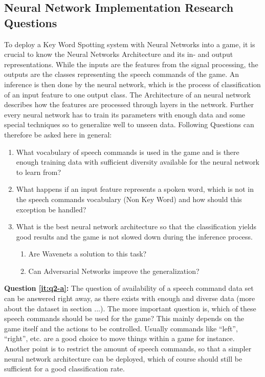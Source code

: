 \subsection{Neural Network Implementation Research Questions}
To deploy a Key Word Spotting system with Neural Networks into a game, it is crucial to know the Neural Networks Architecture and its in- and output representations. 
While the inputs are the features from the signal processing, the outputs are the classes representing the speech commands of the game. 
An inference is then done by the neural network, which is the process of classification of an input feature to one output class.
The Architecture of an neural network describes how the features are processed through layers in the network.
Further every neural network has to train its parameters with enough data and some special techniques so to generalize well to unseen data.
Following Questions can therefore be asked here in general:

\begin{enumerate}[label={Q.2.\alph*)}, leftmargin=1.75cm]
    \item What vocabulary of speech commands is used in the game and is there enough training data with sufficient diversity available for the neural network to learn from?
    \label{it:q2-a}
    
    \item What happens if an input feature represents a spoken word, which is not in the speech commands vocabulary (Non Key Word) and how should this exception be handled?
    \label{it:q2-b}
    
    \item What is the best neural network architecture so that the classification yields good results and the game is not slowed down during the inference process.
    \label{it:q2-c}
    \begin{enumerate}[label=(\roman*)]
        \item Are Wavenets a solution to this task? 
        \item Can Adversarial Networks improve the generalization?
    \end{enumerate}
    
\end{enumerate}
\noindent
\textbf{Question \ref{it:q2-a}:} The question of availability of a speech command data set can be answered right away, as there exists with enough and diverse data (more about the dataset in section ...). The more important question is, which of these speech commands should be used for the game? This mainly depends on the game itself and the actions to be controlled. Usually commands like \enquote{left}, \enquote{right}, etc. are a good choice to move things within a game for instance.
Another point is to restrict the amount of speech commands, so that a simpler neural network architecture can be deployed, which of course should still be sufficient for a good classification rate.


